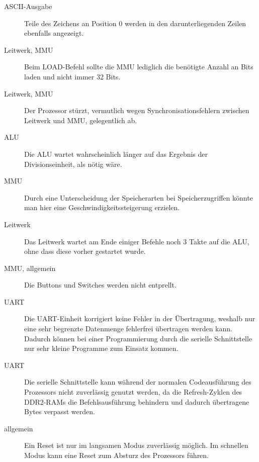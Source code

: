 \begin{description}
\item[ASCII-Ausgabe] Teile des Zeichens an Position 0 werden in den
darunterliegenden Zeilen ebenfalls angezeigt.
\item[Leitwerk, MMU] Beim LOAD-Befehl sollte die MMU lediglich die ben\"otigte
Anzahl an Bits laden und nicht immer 32 Bits.
\item[Leitwerk, MMU] Der Prozessor st\"urzt, vermutlich wegen
Synchronisationsfehlern zwischen Leitwerk und MMU, gelegentlich ab.
\item[ALU] Die ALU wartet wahrscheinlich l\"anger auf das Ergebnis der
Divisionseinheit, als n\"otig w\"are.
\item[MMU] Durch eine Unterscheidung der Speicherarten bei Speicherzugriffen
k\"onnte man hier eine Geschwindigkeitssteigerung erzielen.
\item[Leitwerk] Das Leitwerk wartet am Ende einiger Befehle noch 3 Takte auf
die ALU, ohne dass diese vorher gestartet wurde.
\item[MMU, allgemein] Die Buttons und Switches werden nicht entprellt.
\item[UART] Die UART-Einheit korrigiert keine Fehler in der \"Ubertragung,
weshalb nur eine sehr begrenzte Datenmenge fehlerfrei \"ubertragen werden kann.
Dadurch k\"onnen bei einer Programmierung durch die serielle Schnittstelle nur
sehr kleine Programme zum Einsatz kommen.
\item[UART] Die serielle Schnittstelle kann w\"ahrend der normalen
Codeausf\"uhrung des Prozessors nicht zuverl\"assig genutzt werden, da die
Refresh-Zyklen des DDR2-RAMs die Befehlsausf\"uhrung behindern und dadurch
\"ubertragene Bytes verpasst werden.
\item[allgemein] Ein Reset ist nur im langsamen Modus zuverl\"assig m\"oglich. Im
schnellen Modus kann eine Reset zum Absturz des Prozessors f\"uhren.
\end{description}

